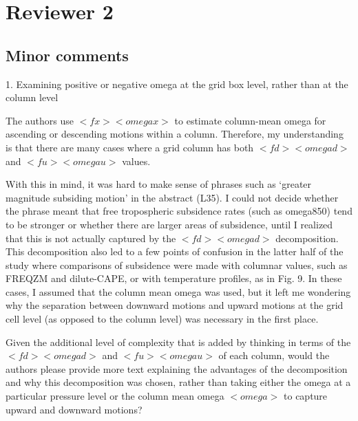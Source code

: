 \documentclass[12pt,oneside,a4paper]{article}%
\begin{document}
\section*{\large Reviewer 2}

\subsection*{\small Minor comments}

1. Examining positive or negative omega at the grid box level, rather than at the column level \newline

The authors use $<fx><omegax>$ to estimate column-mean omega for ascending or descending motions within a column. Therefore, my understanding is that there are many cases where a grid column has both $<fd><omegad>$ and $<fu><omegau>$ values. \newline

With this in mind, it was hard to make sense of phrases such as ‘greater magnitude subsiding motion’ in the abstract (L35). I could not decide whether the phrase meant that free tropospheric subsidence rates (such as omega850) tend to be stronger or whether there are larger areas of subsidence, until I realized that this is not actually captured by the $<fd><omegad>$ decomposition. This decomposition also led to a few points of confusion in the latter half of the study where comparisons of subsidence were made with columnar values, such as FREQZM and dilute-CAPE, or with temperature profiles, as in Fig. 9. In these cases, I assumed that the column mean omega was used, but it left me wondering why the separation between downward motions and upward motions at the grid cell level (as opposed to the column level) was necessary in the first place. \newline

Given the additional level of complexity that is added by thinking in terms of the $<fd><omegad>$ and $<fu><omegau>$ of each column, would the authors please provide more text explaining the advantages of the decomposition and why this decomposition was chosen, rather than taking either the omega at a particular pressure level or the column mean omega $<omega>$ to capture upward and downward motions? \newline
\end{document}
